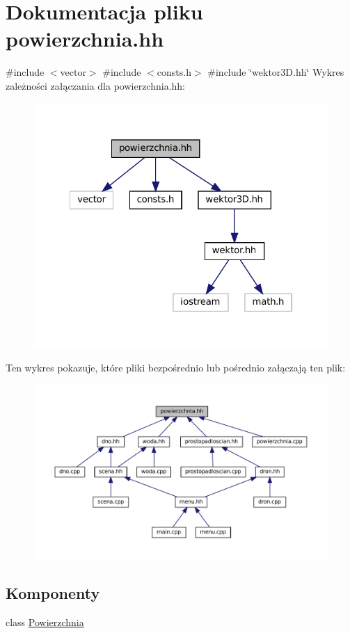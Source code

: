 \hypertarget{powierzchnia_8hh}{}\section{Dokumentacja pliku powierzchnia.\+hh}
\label{powierzchnia_8hh}
{\ttfamily \#include $<$vector$>$}\newline
{\ttfamily \#include $<$consts.\+h$>$}\newline
{\ttfamily \#include \char`\"{}wektor3\+D.\+hh\char`\"{}}\newline
Wykres zależności załączania dla powierzchnia.\+hh\+:\nopagebreak
\begin{figure}[H]
\begin{center}
\leavevmode
\includegraphics[width=322pt]{powierzchnia_8hh__incl}
\end{center}
\end{figure}
Ten wykres pokazuje, które pliki bezpośrednio lub pośrednio załączają ten plik\+:\nopagebreak
\begin{figure}[H]
\begin{center}
\leavevmode
\includegraphics[width=350pt]{powierzchnia_8hh__dep__incl}
\end{center}
\end{figure}
\subsection*{Komponenty}
\begin{DoxyCompactItemize}
\item 
class \mbox{\hyperlink{class_powierzchnia}{Powierzchnia}}
\end{DoxyCompactItemize}
